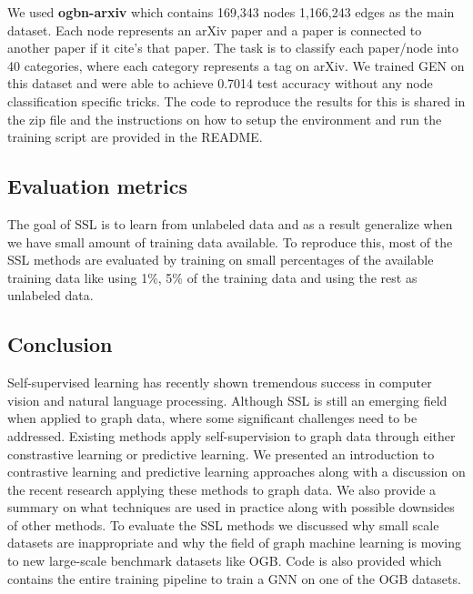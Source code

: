 \documentclass{article}
\begin{document}
We used \textbf{ogbn-arxiv} which contains 169,343 nodes 1,166,243 edges as the main dataset. Each node represents an arXiv paper and a paper is connected to another paper if it cite's that paper. The task is to classify each paper/node into 40 categories, where each category represents a tag on arXiv. We trained GEN \citep{cite11} on this dataset and were able to achieve 0.7014 test accuracy without any node classification specific tricks. The code to reproduce the results for this is shared in the zip file and the instructions on how to setup the environment and run the training script are provided in the README.

\subsection{Evaluation metrics}
The goal of SSL is to learn from unlabeled data and as a result generalize when we have small amount of training data available. To reproduce this, most of the SSL methods are evaluated by training on small percentages of the available training data like using 1\%, 5\% of the training data and using the rest as unlabeled data.

\subsection{Conclusion}
Self-supervised learning has recently shown tremendous success in computer vision and natural language processing. Although SSL is still an emerging field when applied to graph data, where some significant challenges need to be addressed. Existing methods apply self-supervision to graph data through either constrastive learning or predictive learning. We presented an introduction to contrastive learning and predictive learning approaches along with a discussion on the recent research applying these methods to graph data. We also provide a summary on what techniques are used in practice along with possible downsides of other methods. To evaluate the SSL methods we discussed why small scale datasets are inappropriate and why the field of graph machine learning is moving to new large-scale benchmark datasets like OGB. Code is also provided which contains the entire training pipeline to train a GNN on one of the OGB datasets.

\end{document}
